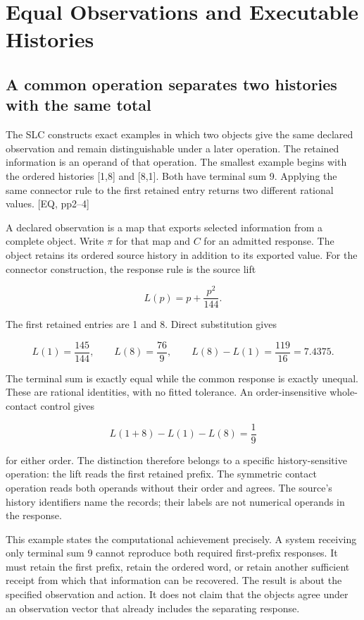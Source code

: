 \chapter{Equal Observations and Executable Histories}\label{equal-observations-and-executable-histories}

\section{A common operation separates two histories with the same total}\label{a-common-operation-separates-two-histories-with-the-same-total}

The SLC constructs exact examples in which two objects give the same declared observation and remain distinguishable under a later operation. The retained information is an operand of that operation. The smallest example begins with the ordered histories {[}1,8{]} and {[}8,1{]}. Both have terminal sum 9. Applying the same connector rule to the first retained entry returns two different rational values. {[}EQ, pp2--4{]}

A declared observation is a map that exports selected information from a complete object. Write \(\pi\) for that map and \(C\) for an admitted response. The object retains its ordered source history in addition to its exported value. For the connector construction, the response rule is the source lift

\[
L(p)=p+\frac{p^2}{144}.
\]

The first retained entries are 1 and 8. Direct substitution gives

\[
L(1)=\frac{145}{144},\qquad L(8)=\frac{76}{9},\qquad L(8)-L(1)=\frac{119}{16}=7.4375.
\]

The terminal sum is exactly equal while the common response is exactly unequal. These are rational identities, with no fitted tolerance. An order-insensitive whole-contact control gives

\[
L(1+8)-L(1)-L(8)=\frac{1}{9}
\]

for either order. The distinction therefore belongs to a specific history-sensitive operation: the lift reads the first retained prefix. The symmetric contact operation reads both operands without their order and agrees. The source's history identifiers name the records; their labels are not numerical operands in the response.

This example states the computational achievement precisely. A system receiving only terminal sum 9 cannot reproduce both required first-prefix responses. It must retain the first prefix, retain the ordered word, or retain another sufficient receipt from which that information can be recovered. The result is about the specified observation and action. It does not claim that the objects agree under an observation vector that already includes the separating response.

